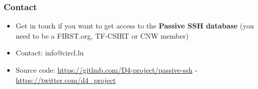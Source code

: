 \documentclass{beamer}
\begin{document}
\begin{frame}
\frametitle{Contact}
\begin{itemize}
        \item Get in touch if you want to get access to the {\bf Passive SSH database} (you need to be a FIRST.org, TF-CSIRT or CNW member)
\item Contact: info@circl.lu
\item Source code: \url{https://github.com/D4-project/passive-ssh} -  \url{https://twitter.com/d4_project}
\end{itemize}
\end{frame}
\end{document}
